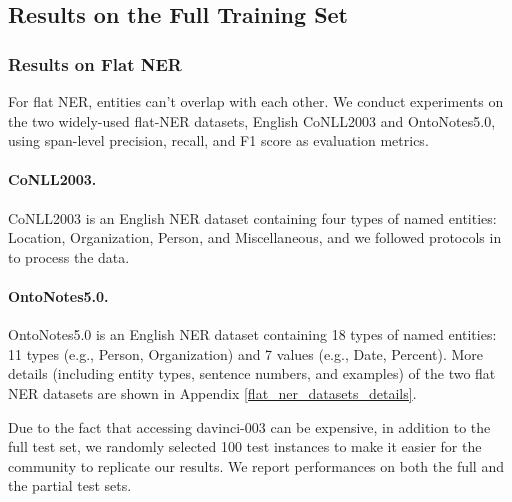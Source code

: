 \documentclass[11pt]{article}
\begin{document}
\subsection{Results on the Full Training Set}

\subsubsection{Results on Flat NER}
For flat NER, entities can't overlap with each other. 
We conduct experiments on the two widely-used flat-NER datasets, English CoNLL2003 and OntoNotes5.0, using span-level precision, recall, and F1 score as evaluation metrics.

\paragraph{CoNLL2003.} CoNLL2003 \citep{sang2003introduction} is an English NER dataset containing four types of named entities: Location, Organization, Person, and Miscellaneous, and we followed protocols in  to process the data.

\paragraph{OntoNotes5.0.} OntoNotes5.0 \citep{pradhan2013towards} is an English NER dataset containing 18 types of named entities: 11 types (e.g., Person, Organization) and 7 values (e.g., Date, Percent).
More details (including entity types, sentence numbers, and examples) of the two flat NER datasets are shown in Appendix \ref{flat_ner_datasets_details}.

Due to the fact that accessing davinci-003 can be expensive, in addition to the full test set, we randomly selected 100 test instances to make it easier for the community to replicate our results. We report performances on both the full and the partial test sets.  
\end{document}
